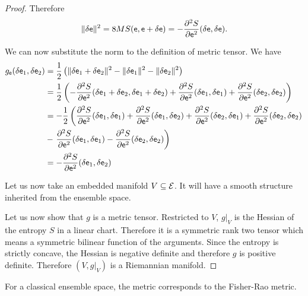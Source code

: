 \begin{proof}
Therefore
$$ \lVert \delta \mathsf{e} \rVert^2 = 8 MS(\mathsf{e}, \mathsf{e} + \delta \mathsf{e}) = -  \frac{\partial^2 S}{\partial \mathsf{e}^2} (\delta \mathsf{e}, \delta \mathsf{e}).$$

We can now substitute the norm to the definition of metric tensor. We have
\begin{equation}
	\begin{aligned}
		g_{\mathsf{e}}(\delta \mathsf{e}_1, \delta \mathsf{e}_2 ) &= \frac{1}{2} \left( \lVert \delta \mathsf{e}_1 + \delta \mathsf{e}_2 \rVert^2 - \lVert \delta \mathsf{e}_1 \rVert^2 - \lVert \delta \mathsf{e}_2 \rVert^2 \right) \\
		&= \frac{1}{2} \left( - \frac{\partial^2 S}{\partial \mathsf{e}^2} (\delta \mathsf{e}_1 + \delta \mathsf{e}_2, \delta \mathsf{e}_1 + \delta \mathsf{e}_2) + \frac{\partial^2 S}{\partial \mathsf{e}^2} (\delta \mathsf{e}_1, \delta \mathsf{e}_1) + \frac{\partial^2 S}{\partial \mathsf{e}^2} (\delta \mathsf{e}_2, \delta \mathsf{e}_2) \right) \\
		&= - \frac{1}{2} \left(  \frac{\partial^2 S}{\partial \mathsf{e}^2} (\delta \mathsf{e}_1, \delta \mathsf{e}_1) + \frac{\partial^2 S}{\partial \mathsf{e}^2} (\delta \mathsf{e}_1, \delta \mathsf{e}_2) + \frac{\partial^2 S}{\partial \mathsf{e}^2} (\delta \mathsf{e}_2, \delta \mathsf{e}_1) + \frac{\partial^2 S}{\partial \mathsf{e}^2} (\delta \mathsf{e}_2, \delta \mathsf{e}_2) \right. \\
		&-  \left. \frac{\partial^2 S}{\partial \mathsf{e}^2} (\delta \mathsf{e}_1, \delta \mathsf{e}_1) - \frac{\partial^2 S}{\partial \mathsf{e}^2} (\delta \mathsf{e}_2, \delta \mathsf{e}_2) \right) \\
		&= - \frac{\partial^2 S}{\partial \mathsf{e}^2} (\delta \mathsf{e}_1, \delta \mathsf{e}_2) \\
	\end{aligned}
\end{equation}

	Let us now take an embedded manifold $V \subseteq \mathcal{E}$. It will have a smooth structure inherited from the ensemble space.
	
	Let us now show that $g$ is a metric tensor. Restricted to $V$, $g|_V$ is the Hessian of the entropy $S$ in a linear chart. Therefore it is a symmetric rank two tensor which means a symmetric bilinear function of the arguments. Since the entropy is strictly concave, the Hessian is negative definite and therefore $g$ is positive definite. Therefore $(V, g|_V)$ is a Riemannian manifold.
\end{proof}

\begin{prop}
	For a classical ensemble space, the metric corresponds to the Fisher-Rao metric.
\end{prop}

